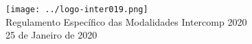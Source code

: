 \begin{center}

	\vspace*{\fill}
	{\let\clearpage\relax \texttt{[image: ../logo-inter019.png]} \\ [.5cm]}
	\Huge{Regulamento Específico das Modalidades Intercomp 2020} \\ [.5cm]
	\normalsize{25 de Janeiro de 2020}
	\vspace*{\fill}

\end{center}
